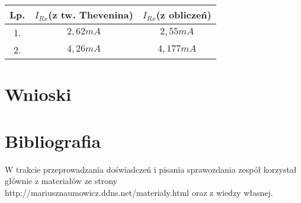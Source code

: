 \documentclass[polish,a4paper]{article}
\begin{document}
\begin{center}
\begin{tabular}{|c|c|c|}
\hline
\textbf{Lp.} & \textbf{$I_{Rx}$(z tw. Thevenina)} & \textbf{$I_{Rx}$(z obliczeń)}\\
\hline
1. & $2,62mA$ & $2,55mA$\\
\hline %
2. & $4,26mA$ & $4,177mA$\\
\hline
\end{tabular}
\end{center}

\section{Wnioski}


\section*{Bibliografia}
W trakcie przeprowadzania doświadczeń i pisania sprawozdania zespół korzystał głównie z materiałów ze strony http://mariusznaumowicz.ddns.net/materialy.html oraz z wiedzy własnej.



\end{document}
